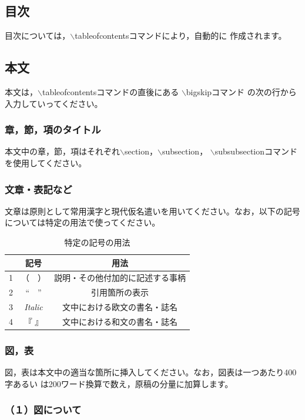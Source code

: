 \documentclass[b5paper,10pt,twocolumn,tombow]{jarticle}
\begin{document}
\subsection{目次}
目次については，$\backslash$tableofcontents{}コマンドにより，自動的に
作成されます。
\subsection{本文}
本文は，$\backslash$tableofcontentsコマンドの直後にある
$\backslash$bigskipコマンド
の次の行から入力していってください。
\subsubsection{章，節，項のタイトル}
本文中の章，節，項はそれぞれ$\backslash$section{}，$\backslash$subsection{}，
$\backslash$subsubsection{}コマンドを使用してください。

\subsubsection{文章・表記など}
文章は原則として常用漢字と現代仮名遣いを用いてください。なお，以下の記号
については特定の用法で使ってください。
\begin{table}[ht!]
\begin{center}
\small
\begin{tabular}{ccc} \hline
&記号 &用法 \\ \hline
1 &（　） &説明・その他付加的に記述する事柄 \\
2 &``　'' &引用箇所の表示 \\
3 &\textit{Italic} &文中における欧文の書名・誌名 \\
4 &『 』 &文中における和文の書名・誌名 \\ \hline
\end{tabular}
 \caption{特定の記号の用法}
\end{center}
\end{table}
\normalsize


\subsubsection{図，表}
図，表は本文中の適当な箇所に挿入してください。なお，図表は一つあたり400字あるい
は200ワード換算で数え，原稿の分量に加算します。

\subsubsection*{（１）図について}
\end{document}
